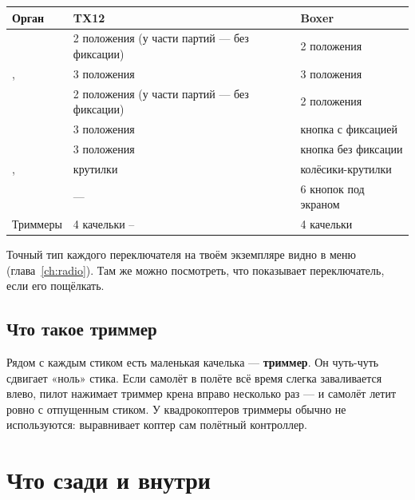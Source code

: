\begin{center}\small
\renewcommand{\arraystretch}{1.2}
\begin{tabularx}{\linewidth}{@{}L{24mm}L{52mm}Y@{}}
\toprule
\textbf{Орган} & \textbf{TX12} & \textbf{Boxer} \\
\midrule
{} & 2 положения (у части партий --- без фиксации) & 2 положения \\
,  & 3 положения & 3 положения \\
 & 2 положения (у части партий --- без фиксации) & 2 положения \\
 & 3 положения & кнопка с фиксацией \\
 & 3 положения & кнопка без фиксации \\
,  & крутилки & колёсики-крутилки \\
 & --- & 6 кнопок под экраном \\
Триммеры & 4 качельки -- & 4 качельки \\
\bottomrule
\end{tabularx}
\end{center}

\begin{tip}
Точный тип каждого переключателя на твоём экземпляре видно в меню 
(глава~\ref{ch:radio}). Там же можно посмотреть, что показывает переключатель, если его
пощёлкать.
\end{tip}

\subsection{Что такое триммер}

Рядом с каждым стиком есть маленькая качелька --- \textbf{триммер}. Он чуть-чуть сдвигает
«ноль» стика. Если самолёт в полёте всё время слегка заваливается влево, пилот нажимает
триммер крена вправо несколько раз --- и самолёт летит ровно с отпущенным стиком.
У квадрокоптеров триммеры обычно не используются: выравнивает коптер сам полётный контроллер.

\section{Что сзади и внутри}

